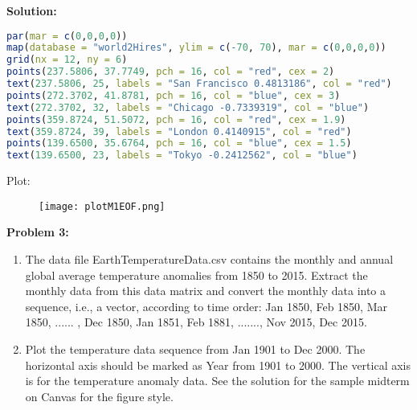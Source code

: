 \documentclass[12pt]{article}
\newenvironment{problem}[1]{
    \textbf{Problem #1:}
}{
    \rmfamily \vspace{2em}
}
\newenvironment{solution}{
    \textbf{Solution:}
    
}{
    
    \vspace{2em}
}
\begin{document}
\begin{solution}
\begin{enumerate}[label=\alph*)]
\begin{lstlisting}[language=R]
par(mar = c(0,0,0,0))
map(database = "world2Hires", ylim = c(-70, 70), mar = c(0,0,0,0))
grid(nx = 12, ny = 6)
points(237.5806, 37.7749, pch = 16, col = "red", cex = 2)
text(237.5806, 25, labels = "San Francisco 0.4813186", col = "red")
points(272.3702, 41.8781, pch = 16, col = "blue", cex = 3)
text(272.3702, 32, labels = "Chicago -0.7339319", col = "blue")
points(359.8724, 51.5072, pch = 16, col = "red", cex = 1.9)
text(359.8724, 39, labels = "London 0.4140915", col = "red")
points(139.6500, 35.6764, pch = 16, col = "blue", cex = 1.5)
text(139.6500, 23, labels = "Tokyo -0.2412562", col = "blue")
        \end{lstlisting}
        Plot:
        \begin{figure}[H]
            \centering
            \texttt{[image: plotM1EOF.png]}
        \end{figure}
    \end{enumerate}
\end{solution}

\begin{problem}{3}
    \begin{enumerate}[label=\alph*)]
        \item The data file EarthTemperatureData.csv contains the monthly and annual
        global average temperature anomalies from 1850 to 2015. Extract the monthly data from this data
        matrix and convert the monthly data into a sequence, i.e., a vector, according to time order: Jan 1850,
        Feb 1850, Mar 1850, ...... , Dec 1850, Jan 1851, Feb 1881, ......., Nov 2015, Dec 2015.
        \item Plot the temperature data sequence from Jan 1901 to Dec 2000. The horizontal axis
        should be marked as Year from 1901 to 2000. The vertical axis is for the temperature anomaly data. See
        the solution for the sample midterm on Canvas for the figure style.
    \end{enumerate}
\end{problem}
\end{document}
